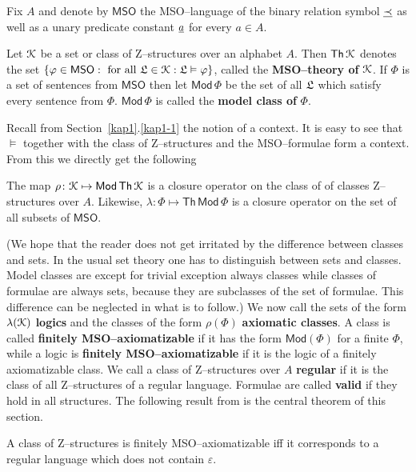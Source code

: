 Fix $A$ and denote by $\mathsf{MSO}$ the MSO--language of the binary 
relation symbol $\underline{\prec}$ as well as a unary predicate constant
$\underline{a}$ for every $a \in A$.
\begin{defn}
Let $\mathcal{K}$ be a set or class of Z--structures over an alphabet
$A$. Then $\mathsf{Th}\, \mathcal{K}$ denotes the set
$\{\varphi \in \mathsf{MSO} : \mbox{ for all }\mathfrak{L}  \in
\mathcal{K}: \mathfrak{L} \vDash \varphi\}$, called the \textbf{MSO--theory
of} $\mathcal{K}$. If $\Phi$ is a set of sentences from $\mathsf{MSO}$ then 
let $\mathsf{Mod}\, \Phi$ be the set of all $\mathfrak{L}$ which satisfy 
every sentence from $\Phi$. $\mathsf{Mod}\, \Phi$ is called the 
\textbf{model class of} $\Phi$.
\end{defn}
Recall from Section~\ref{kap1}.\ref{kap1-1} the notion of a context. It is
easy to see that $\vDash$ together with the class of Z--structures
and the MSO--formulae form a context. From this we directly get the
following
\begin{thm}
The map $\rho \colon \mathcal{K} \mapsto \mathsf{Mod}\, \mathsf{Th}\, \mathcal{K}$
is a closure operator on the class of of classes Z--structures over
$A$. Likewise, $\lambda \colon \Phi \mapsto \mathsf{Th}\, \mathsf{Mod}\,
\Phi$ is a closure operator on the set of all subsets of
$\mathsf{MSO}$.
\end{thm}
(We hope that the reader does not get irritated by the difference
between classes and sets. In the usual set theory one has to
distinguish  between sets and classes. Model classes are except for
trivial exception always classes  while classes of formulae are
always sets, because they are subclasses of the set of formulae.
This difference can be neglected in what is to follow.)
We now call the sets of the form $\lambda(\mathcal{K})$ \textbf{logics} and
the classes of the form $\rho(\Phi)$ \textbf{axiomatic classes}. A
class is called \textbf{finitely MSO--axiomatizable} if it has the 
form $\mathsf{Mod}(\Phi)$ for a finite $\Phi$, while a logic is 
\textbf{finitely MSO--axiomatizable} if it is the logic of a finitely
axiomatizable class. We call a class of Z--structures over $A$
\textbf{regular} if it is the class of all Z--structures of a regular
language. Formulae are called \textbf{valid} if they hold in all 
structures. The following result from \cite{buechi:weak} is the 
central theorem of this section.
\begin{thm}[B\"uchi]
\label{thm:buechi} 
A class of Z--structures is finitely
MSO--axiomatizable iff it corresponds to a regular language 
which does not contain $\varepsilon$.
\end{thm}
